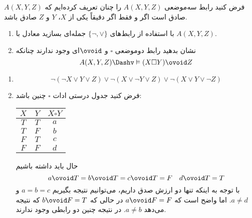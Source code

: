 فرض کنید رابط سه‌موضعی $A(X,Y,Z)$ را چنان تعریف کرده‌ایم که $A(X,Y,Z)$ صادق است اگر و فقط اگر دقیقاً یکی از $X$، $Y$ و $Z$ صادق باشد.

\begin{enumerate}
\item
با استفاده از رابط‌های
$\{\neg,\vee\}$
جمله‌ای بسازید معادل با
$A(X,Y,Z)$.
\item
نشان بدهید رابط دوموضعی $\square$ و $\ovoid$ای وجود ندارند چنانکه
$$
A(X,Y,Z)\Dashv\vDash(X\square Y)\ovoid Z
$$
\end{enumerate}\quad
\begin{ans}
\begin{enumerate}
\item
$$
\neg(\neg X\vee Y\vee Z)\vee\neg(X\vee\neg Y\vee Z)\vee\neg(X\vee Y\vee\neg Z)
$$
\item
فرض کنید جدول درستی ادات
$\square$
چنین باشد:

\begin{tabular}{c|c|c}
$X$ & $Y$ & $X\square Y$ \\
\hline
$T$ & $T$ & $a$ \\
$T$ & $F$ & $b$ \\
$F$ & $T$ & $c$ \\
$F$ & $F$ & $d$ \\
\end{tabular}

حال باید داشته باشیم
$$
a\ovoid T = b\ovoid T = c\ovoid T = F \quad d\ovoid T = T
$$
با توجه به اینکه تنها دو ارزش صدق داریم، می‌توانیم نتیجه بگیریم
$a=b=c$
و
$a\neq d$.
اما واضح است که
$a\ovoid F=F$
در حالی که
$b\ovoid F=T$
که نتیجه می‌دهد
$a\neq b$.
در نتیجه چنین دو رابطی وجود ندارند.

\end{enumerate}
\end{ans}